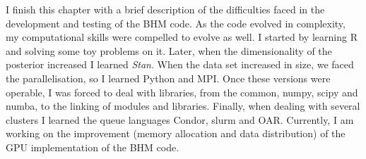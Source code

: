 I finish this chapter with a brief description of the difficulties faced in the development and testing of the BHM code. As the code evolved in complexity, my computational skills were compelled to evolve as well. I started by learning R and solving some toy problems on it. Later, when the dimensionality of the posterior increased I learned \emph{Stan}. When the data set increased in size, we faced the parallelisation, so I learned Python and MPI. Once these versions were operable, I was forced to deal with libraries, from the common, numpy, scipy and numba, to the linking of modules and libraries. Finally, when dealing with several clusters I learned the queue languages Condor, slurm and OAR. Currently, I am working on the improvement (memory allocation and data distribution) of the GPU implementation of the BHM code.  



